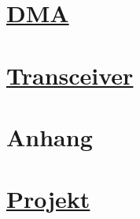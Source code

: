 \documentclass[11pt,german]{scrartcl}
\begin{document}


\clearpage
\section
{\href{http://cst.mi.fu-berlin.de/intern/19606-P-MPP/Aufgaben/041000.html}
{DMA}}



\clearpage
\section
{\href{http://cst.mi.fu-berlin.de/intern/19606-P-MPP/Aufgaben/041100.html}
{Transceiver}}




\clearpage
\section{Anhang}




\clearpage
\section{\href{http://cst.mi.fu-berlin.de/intern/19606-P-MPP/Aufgaben/041200.html}
{Projekt}}


\end{document}
